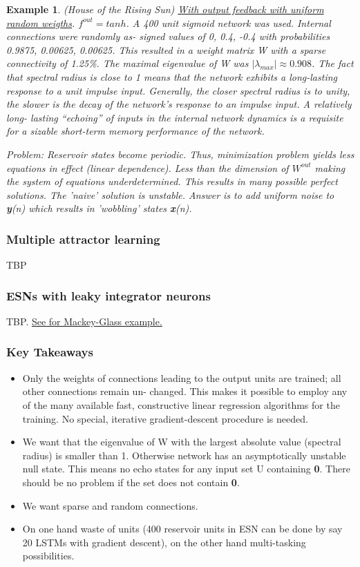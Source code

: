 \documentclass{article}
\newtheorem{example}{Example}
\begin{document}
\begin{example}
(House of the Rising Sun) \underline{With output feedback with uniform random weigths}. $f^{out} = tanh$. A 400 unit sigmoid network was used. Internal connections were randomly as- signed values of 0, 0.4, -0.4 with probabilities 0.9875, 0.00625, 0.00625. This resulted in a weight matrix W with a sparse connectivity of 1.25\%. The maximal eigenvalue of W was $| \lambda_{max}| \approx 0.908$. The fact that spectral radius is close to 1 means that the network exhibits a long-lasting response to a unit impulse input. Generally, the closer spectral radius is to unity, the slower is the decay of the network’s response to an impulse input. A relatively long- lasting “echoing” of inputs in the internal network dynamics is a requisite for a sizable short-term memory performance of the network.

Problem: Reservoir states become periodic. Thus, minimization problem yields less equations in effect (linear dependence). Less than the dimension of $W^{out}$ making the system of equations underdetermined. This results in many possible perfect solutions. The 'naive' solution is unstable. Answer is to add uniform noise to \textbf y(n) which results in 'wobbling' states \textbf x(n).
\end{example}

\subsubsection{Multiple attractor learning}
TBP
\subsubsection{ESNs with leaky integrator neurons}
TBP. \href{https://quantumyilmaz.github.io/MTFS21/Examples/SimpleESN/large/SimpleESN_large.html}{\color{blue}See for Mackey-Glass example.}

\subsubsection{Key Takeaways}
\begin{itemize}
    \item Only the weights of connections leading to the output units are trained; all other connections remain un- changed. This makes it possible to employ any of the many available fast, constructive linear regression algorithms for the training. No special, iterative gradient-descent procedure is needed.
    
    \item We want that the eigenvalue of W with the largest absolute value (spectral radius) is smaller than 1. Otherwise network has an asymptotically unstable null state. This means no echo states for any input set U containing \textbf{0}. There should be no problem if the set does not contain \textbf{0}.
    \item We want sparse and random connections.
    
    \item On one hand waste of units (400 reservoir units in ESN can be done by say 20 LSTMs with gradient descent), on the other hand multi-tasking possibilities.
\end{itemize}
\end{document}

